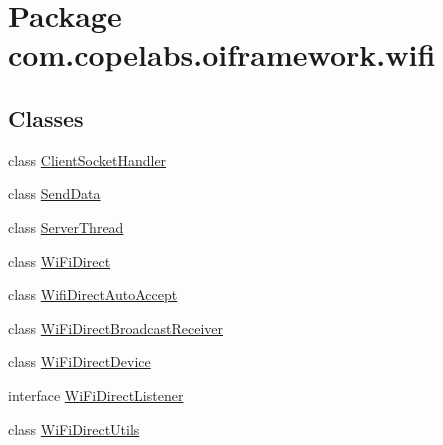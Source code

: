 \hypertarget{namespacecom_1_1copelabs_1_1oiframework_1_1wifi}{}\section{Package com.\+copelabs.\+oiframework.\+wifi}
\label{namespacecom_1_1copelabs_1_1oiframework_1_1wifi}
\subsection*{Classes}
\begin{DoxyCompactItemize}
\item 
class \hyperlink{classcom_1_1copelabs_1_1oiframework_1_1wifi_1_1_client_socket_handler}{Client\+Socket\+Handler}
\item 
class \hyperlink{classcom_1_1copelabs_1_1oiframework_1_1wifi_1_1_send_data}{Send\+Data}
\item 
class \hyperlink{classcom_1_1copelabs_1_1oiframework_1_1wifi_1_1_server_thread}{Server\+Thread}
\item 
class \hyperlink{classcom_1_1copelabs_1_1oiframework_1_1wifi_1_1_wi_fi_direct}{Wi\+Fi\+Direct}
\item 
class \hyperlink{classcom_1_1copelabs_1_1oiframework_1_1wifi_1_1_wifi_direct_auto_accept}{Wifi\+Direct\+Auto\+Accept}
\item 
class \hyperlink{classcom_1_1copelabs_1_1oiframework_1_1wifi_1_1_wi_fi_direct_broadcast_receiver}{Wi\+Fi\+Direct\+Broadcast\+Receiver}
\item 
class \hyperlink{classcom_1_1copelabs_1_1oiframework_1_1wifi_1_1_wi_fi_direct_device}{Wi\+Fi\+Direct\+Device}
\item 
interface \hyperlink{interfacecom_1_1copelabs_1_1oiframework_1_1wifi_1_1_wi_fi_direct_listener}{Wi\+Fi\+Direct\+Listener}
\item 
class \hyperlink{classcom_1_1copelabs_1_1oiframework_1_1wifi_1_1_wi_fi_direct_utils}{Wi\+Fi\+Direct\+Utils}
\end{DoxyCompactItemize}
